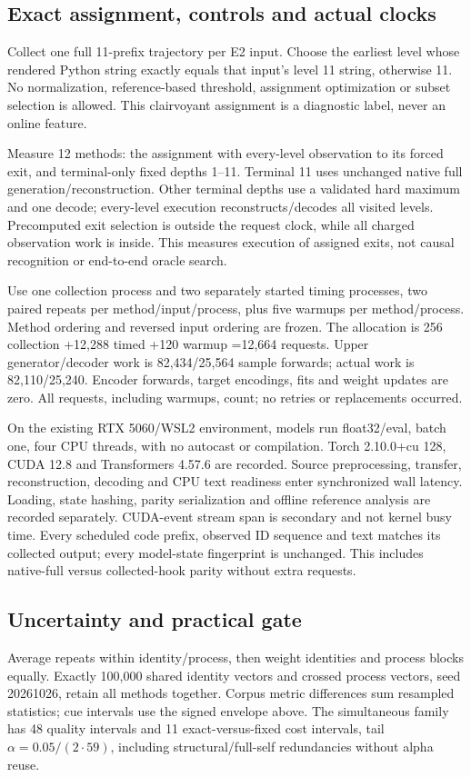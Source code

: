 \documentclass[11pt]{article}
\begin{document}
\subsection{Exact assignment, controls and actual clocks}
Collect one full 11-prefix trajectory per E2 input. Choose the earliest level whose rendered Python string exactly equals that input's level 11 string, otherwise 11. No normalization, reference-based threshold, assignment optimization or subset selection is allowed. This clairvoyant assignment is a diagnostic label, never an online feature.

Measure 12 methods: the assignment with every-level observation to its forced exit, and terminal-only fixed depths 1--11. Terminal 11 uses unchanged native full generation/reconstruction. Other terminal depths use a validated hard maximum and one decode; every-level execution reconstructs/decodes all visited levels. Precomputed exit selection is outside the request clock, while all charged observation work is inside. This measures execution of assigned exits, not causal recognition or end-to-end oracle search.

Use one collection process and two separately started timing processes, two paired repeats per method/input/process, plus five warmups per method/process. Method ordering and reversed input ordering are frozen. The allocation is 256 collection +12,288 timed +120 warmup =12,664 requests. Upper generator/decoder work is 82,434/25,564 sample forwards; actual work is 82,110/25,240. Encoder forwards, target encodings, fits and weight updates are zero. All requests, including warmups, count; no retries or replacements occurred.

On the existing RTX 5060/WSL2 environment, models run float32/eval, batch one, four CPU threads, with no autocast or compilation. Torch 2.10.0+cu 128, CUDA 12.8 and Transformers 4.57.6 are recorded. Source preprocessing, transfer, reconstruction, decoding and CPU text readiness enter synchronized wall latency. Loading, state hashing, parity serialization and offline reference analysis are recorded separately. CUDA-event stream span is secondary and not kernel busy time. Every scheduled code prefix, observed ID sequence and text matches its collected output; every model-state fingerprint is unchanged. This includes native-full versus collected-hook parity without extra requests.

\subsection{Uncertainty and practical gate}
Average repeats within identity/process, then weight identities and process blocks equally. Exactly 100,000 shared identity vectors and crossed process vectors, seed 20261026, retain all methods together. Corpus metric differences sum resampled statistics; cue intervals use the signed envelope above. The simultaneous family has 48 quality intervals and 11 exact-versus-fixed cost intervals, tail \(\alpha=0.05/(2\cdot 59)\), including structural/full-self redundancies without alpha reuse.
\end{document}
